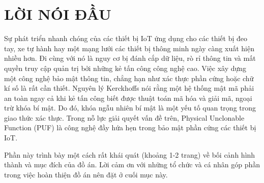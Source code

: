 \section*{LỜI NÓI ĐẦU}
\thispagestyle{empty}
Sự phát triển nhanh chóng của các thiết bị IoT ứng dụng cho các thiết bị đeo tay, xe tự hành hay một mạng lưới các thiết bị thông minh ngày càng xuất hiện nhiều hơn. Đi cùng với nó là nguy cơ bị đánh cắp dữ liệu, rò rỉ thông tin và mất quyền truy cập quản trị bởi những kẻ tấn công công nghệ cao. Việc xây dựng một công nghệ bảo mật thông tin, chẳng hạn như xác thực phần cứng hoặc chữ kí số là rất cần thiết. Nguyên lý Kerckhoffs nói rằng một hệ thống mật mã phải an toàn ngay cả khi kẻ tấn công biết được thuật toán mã hóa và giải mã, ngoại trừ khóa bí mật. Do đó, khóa ngẫu nhiên bí mật là một yếu tố quan trọng trong giao thức xác thực. Trong nỗ lực giải quyết vấn đề trên, Physical Unclonable Function (PUF) là công nghệ đầy hứa hẹn trong bảo mật phần cứng các thiết bị IoT. 

Phần này trình bày một cách rất khái quát (khoảng 1-2 trang) về bối cảnh hình thành và mục đích của đồ án. Lời cảm ơn với những tổ chức và cá nhân góp phần trong việc hoàn thiện đồ án nên đặt ở cuối mục này.
\cleardoublepage